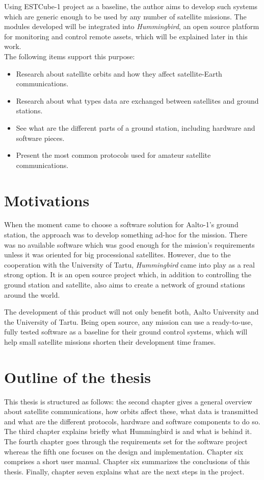 Using ESTCube-1 project as a baseline, the author aims to develop such systems which are generic enough to be used by any number of satellite missions. The modules developed will be integrated into \emph{Hummingbird}, an open source platform for monitoring and control remote assets, which will be explained later in this work.\\ 
\newpage
The following items support this purpose:
\begin{itemize}
	\item Research about satellite orbits and how they affect satellite-Earth communications.
	\item Research about what types data are exchanged between satellites and ground stations.
	\item See what are the different parts of a ground station, including hardware and software pieces.
	\item Present the most common protocols used for amateur satellite communications. 
\end{itemize}

\section{Motivations}

When the moment came to choose a software solution for Aalto-1's ground station, the approach was to develop something ad-hoc for the mission. There was no available software which was good enough for the mission's requirements unless it was oriented for big processional satellites. However, due to the cooperation with the University of Tartu, \emph{Hummingbird} came into play as a real strong option. It is an open source project which, in addition to controlling the ground station and satellite, also aims to create a network of ground stations around the world. 

The development of this product will not only benefit both, Aalto University and the University of Tartu. Being open source, any mission can use a ready-to-use, fully tested software as a baseline for their ground control systems, which will help small satellite missions shorten their development time frames. 


\section{Outline of the thesis}
This thesis is structured as follows: the second chapter gives a general overview about satellite communications, how orbits affect these, what data is transmitted and what are the different protocols, hardware and software components to do so. The third chapter explains briefly what Hummingbird is and what is behind it. The fourth chapter goes through the requirements set for the software project whereas the fifth one focuses on the design and implementation. Chapter six comprises a short user manual. Chapter six summarizes the conclusions of this thesis. Finally, chapter seven explains what are the next steps in the project.

\newpage
